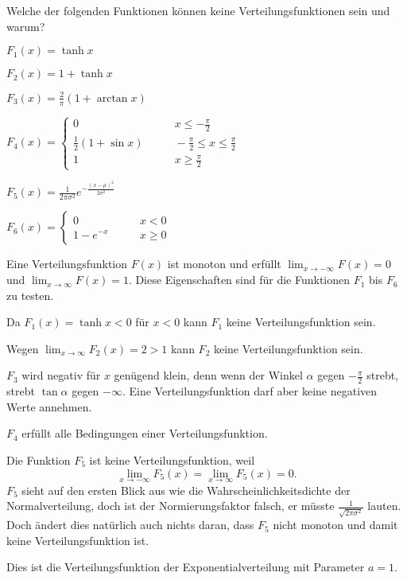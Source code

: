 Welche der folgenden Funktionen können keine Verteilungsfunktionen sein
und warum?
\begin{teilaufgaben}
\item $F_1(x)=\tanh x$
\item $F_2(x)=1+\tanh x$
\item $F_3(x)=\frac2{\pi}(1+\arctan x)$
\item $F_4(x)=\begin{cases}
0&\qquad x\le -\frac{\pi}2\\
\frac12(1+\sin x)&\qquad-\frac{\pi}2\le x\le \frac{\pi}2\\
1&\qquad x\ge \frac{\pi}2
\end{cases}$
\item $F_5(x)=\frac1{2\pi\sigma^2}e^{-\frac{(x-\mu)^2}{2\sigma^2}}$
\item $F_6(x)=\begin{cases}0&\qquad x<0\\1-e^{-x}&\qquad x\ge 0\end{cases}$
\end{teilaufgaben}


\begin{loesung}
Eine Verteilungsfunktion $F(x)$ ist monoton und erfüllt
$\lim_{x\to-\infty}F(x)=0$
und
$\lim_{x\to\infty}F(x)=1$. Diese Eigenschaften sind für die
Funktionen $F_1$ bis $F_6$ zu testen.
\begin{teilaufgaben}
\item Da $F_1(x)=\tanh x<0$ für $x<0$ kann $F_1$ keine Verteilungsfunktion sein.
\item Wegen $\lim_{x\to\infty}F_2(x)=2>1$ kann $F_2$ keine Verteilungsfunktion sein.
\item $F_3$ wird negativ für $x$ genügend klein, denn wenn der Winkel
$\alpha$ gegen $-\frac{\pi}2$ strebt, strebt $\tan\alpha$ gegen $-\infty$.
Eine Verteilungsfunktion darf aber keine negativen Werte annehmen.
\item $F_4$ erfüllt alle Bedingungen einer Verteilungsfunktion.
\item Die Funktion $F_5$ ist keine Verteilungsfunktion, weil
\[
\lim_{x\to-\infty}F_5(x)=\lim_{x\to\infty}F_5(x)=0.
\]
$F_5$ sieht auf den ersten
Blick aus wie die Wahrscheinlichkeitsdichte der Normalverteilung, doch ist
der Normierungsfaktor falsch, er müsste $\frac1{\sqrt{2\pi\sigma^2}}$ lauten.
Doch ändert dies natürlich auch nichts daran, dass $F_5$ nicht monoton und damit
keine Verteilungsfunktion ist.
\item Dies ist die Verteilungsfunktion der Exponentialverteilung mit Parameter $a=1$.
\qedhere
\end{teilaufgaben}
\end{loesung}

